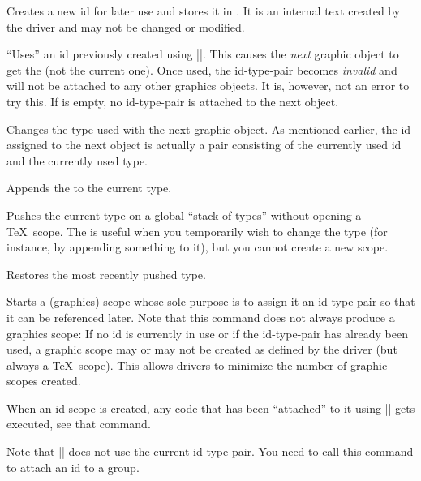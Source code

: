 \begin{command}{\pgfsys@new@id{}}
    Creates a new id for later use and stores it in . It is an
    internal text created by the driver and may not be changed or modified.
\end{command}

\begin{command}{\pgfsys@use@id{}}
    ``Uses'' an id previously created using |\pgfsys@new@id|. This causes the
    \emph{next} graphic object to get the  (not the current one). Once
    used, the id-type-pair becomes \emph{invalid} and will not be attached to
    any other graphics objects. It is, however, not an error to try this. If
     is empty, no id-type-pair is attached to the next object.
\end{command}

\begin{command}{\pgfsys@use@type{}}
    Changes the type used with the next graphic object. As mentioned earlier,
    the id assigned to the next object is actually a pair consisting of the
    currently used id and the currently used type.
\end{command}

\begin{command}{\pgfsys@append@type{}}
    Appends the  to the current type.
\end{command}

\begin{command}{\pgfsys@push@type}
    Pushes the current type on a global ``stack of types'' without opening a
    \TeX\ scope. The is useful when you temporarily wish to change the type
    (for instance, by appending something to it), but you cannot create a new
    scope.
\end{command}

\begin{command}{\pgfsys@pop@type}
    Restores the most recently pushed type.
\end{command}

\begin{command}{\pgfsys@begin@idscope}
    Starts a (graphics) scope whose sole purpose is to assign it an
    id-type-pair so that it can be referenced later. Note that this command
    does not always produce a graphics scope: If no id is currently in use or
    if the id-type-pair has already been used, a graphic scope may or may not
    be created as defined by the driver (but always a \TeX\ scope). This allows
    drivers to minimize the number of graphic scopes created.

    When an id scope is created, any code that has been ``attached'' to it
    using |\pgfsys@attach@to@id| gets executed, see that command.

    Note that |\pgfsys@beginscope| does not use the current id-type-pair. You
    need to call this command to attach an id to a group.
\end{command}

